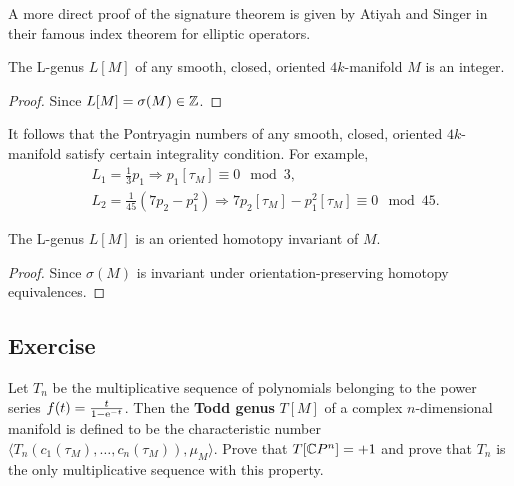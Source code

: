 A more direct proof of the signature theorem is given by Atiyah and Singer in their famous index theorem for elliptic operators.

\begin{corollary}
    The L-genus $L[M]$ of any smooth, closed, oriented $4k$-manifold $M$ is an integer.
\end{corollary}
\begin{proof}
    Since $L[M] = \sigma(M) \in \mathbb{Z}$.
\end{proof}
It follows that the Pontryagin numbers of any smooth, closed, oriented $4k$-manifold satisfy certain integrality condition. 
For example, 
\begin{align*}
    &L_1 = \frac{1}{3} p_1\Rightarrow p_1[\tau_M] \equiv 0 \mod 3, \\
    &L_2 = \frac{1}{45} (7 p_2 - p_1^2) \Rightarrow 7 p_2[\tau_M] - p_1^2[\tau_M] \equiv 0 \mod 45.
\end{align*}

\begin{corollary}
    The L-genus $L[M]$ is an oriented homotopy invariant of $M$.
\end{corollary}
\begin{proof}
    Since $\sigma(M)$ is invariant under orientation-preserving homotopy equivalences. 
\end{proof}

\subsection{Exercise}
\begin{problemstar}[19-A]
Let ${T_n}$ be the multiplicative sequence of polynomials belonging to the power series
$f(t) = \frac{t}{1-{\rm e}^{-t}}$. Then the \textbf{Todd genus} $T[M]$ of a complex $n$-dimensional
manifold is defined to be the characteristic number $\langle T_n(c_1(\tau_M), \dots, c_n(\tau_M)), \mu_M \rangle$. 
Prove that $T[\mathbb{C} P^n] = +1$ and prove that ${T_n}$ is the only multiplicative sequence with this property.
\end{problemstar}


